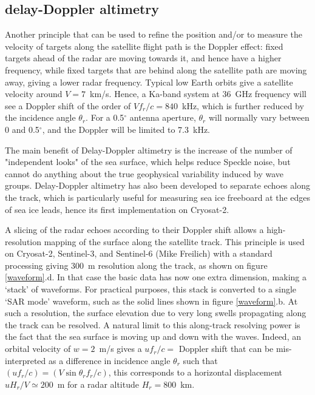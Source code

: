 \subsection{delay-Doppler altimetry}\label{section:delay-Doppler}
Another principle that can be used to refine the position and/or to measure the velocity of targets along the satellite flight path is the Doppler effect: fixed targets ahead of the radar are moving towards it, and hence have a higher frequency, while fixed targets that are behind along the satellite path 
are moving away, giving a lower radar frequency. Typical low Earth orbits give a satellite velocity around $V=7$~km/s. Hence, a Ka-band system at 36~GHz frequency will see a Doppler shift
of the order of $V f_r/c = 840$~kHz, which is further reduced by the incidence angle $\theta_r$. For a 0.5$^\circ$  antenna aperture, $\theta_r$ will 
normally vary between 0 and 0.5$^\circ$,  and the Doppler will be limited to 7.3~kHz.  

The main benefit of Delay-Doppler altimetry is the increase of the number of "independent looks" of the sea surface, which helps reduce Speckle noise, but cannot do anything about the true geophysical variability induced by wave groups. Delay-Doppler altimetry has also been developed to separate echoes along the track, which is particularly useful for measuring sea ice freeboard at the edges of sea ice leads, hence its first implementation on Cryosat-2. 


A slicing of the radar echoes according to their Doppler shift allows a high-resolution mapping of the surface along the satellite track. 
This principle is used on  Cryosat-2, Sentinel-3, and Sentinel-6 (Mike Freilich) with a standard processing giving 300~m resolution along the track, as shown on figure \ref{waveform}.d. In that case the basic 
data has now one extra dimension, making a `stack' of waveforms. For practical purposes, this stack is converted to a single `SAR mode' waveform, such as the solid lines 
shown in figure \ref{waveform}.b. 
At such a  resolution, the surface elevation due to  very long swells propagating along the track can be resolved. 
A natural limit to this along-track resolving power is the fact that the sea surface is moving up and down with the waves. Indeed, an orbital velocity 
of $w=2$~m/s gives a $u f_r / c=$ Doppler shift that can be mis-interpreted as a difference in incidence angle $\theta_r$ such that  
$(u f_r / c)=(V \sin\theta_r  f_r/c)$, this corresponds to a horizontal displacement $u H_r/V \simeq 200$~m for a radar altitude 
$H_r = 800$~km. 


